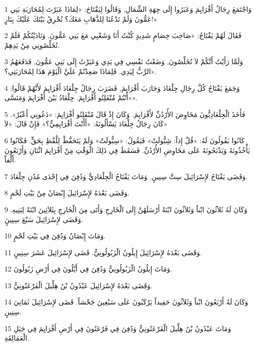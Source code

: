 \par 1 وَاجْتَمَعَ رِجَالُ أَفْرَايِمَ وَعَبَرُوا إِلَى جِهَةِ الشِّمَالِ, وَقَالُوا لِيَفْتَاحَ: «لِمَاذَا عَبَرْتَ لِمُحَارَبَةِ بَنِي عَمُّونَ وَلَمْ تَدْعُنَا لِلذَّهَابِ مَعَكَ؟ نُحْرِقُ بَيْتَكَ عَلَيْكَ بِنَارٍ!»
\par 2 فَقَالَ لَهُمْ يَفْتَاحُ: «صَاحِبَ خِصَامٍ شَدِيدٍ كُنْتُ أَنَا وَشَعْبِي مَعَ بَنِي عَمُّونَ, وَنَادَيْتُكُمْ فَلَمْ تُخَلِّصُونِي مِنْ يَدِهِمْ.
\par 3 وَلَمَّا رَأَيْتُ أَنَّكُمْ لاَ تُخَلِّصُونَ, وَضَعْتُ نَفْسِي فِي يَدِي وَعَبَرْتُ إِلَى بَنِي عَمُّونَ, فَدَفَعَهُمُ الرَّبُّ لِيَدِي. فَلِمَاذَا صَعِدْتُمْ عَلَيَّ الْيَوْمَ هَذَا لِمُحَارَبَتِي؟».
\par 4 وَجَمَعَ يَفْتَاحُ كُلَّ رِجَالِ جِلْعَادَ وَحَارَبَ أَفْرَايِمَ, فَضَرَبَ رِجَالُ جِلْعَادَ أَفْرَايِمَ لأَنَّهُمْ قَالُوا: «أَنْتُمْ مُنْفَلِتُو أَفْرَايِمَ. جِلْعَادُ بَيْنَ أَفْرَايِمَ وَمَنَسَّى».
\par 5 فَأَخَذَ الْجِلْعَادِيُّونَ مَخَاوِضَ الأُرْدُنِّ لأَفْرَايِمَ. وَكَانَ إِذْ قَالَ مُنْفَلِتُو أَفْرَايِمَ: «دَعُونِي أَعْبُرْ». كَانَ رِجَالُ جِلْعَادَ يَسْأَلُونَهُ: «أَأَنْتَ أَفْرَايِمِيٌّ؟» فَإِنْ قَالَ: «لاَ»
\par 6 كَانُوا يَقُولُونَ لَهُ: «قُلْ إِذاً: شِبُّولَتْ» فَيَقُولُ: «سِبُّولَتْ» وَلَمْ يَتَحَفَّظْ لِلَّفْظِ بِحَقٍّ. فَكَانُوا يَأْخُذُونَهُ وَيَذْبَحُونَهُ عَلَى مَخَاوِضِ الأُرْدُنِّ. فَسَقَطَ فِي ذَلِكَ الْوَقْتِ مِنْ أَفْرَايِمَ اثْنَانِ وَأَرْبَعُونَ أَلْفاً.
\par 7 وَقَضَى يَفْتَاحُ لإِسْرَائِيلَ سِتَّ سِنِينٍ. وَمَاتَ يَفْتَاحُ الْجِلْعَادِيُّ وَدُفِنَ فِي إِحْدَى مُدُنِ جِلْعَادَ.
\par 8 وَقَضَى بَعْدَهُ لإِسْرَائِيلَ إِبْصَانُ مِنْ بَيْتِ لَحْمٍ.
\par 9 وَكَانَ لَهُ ثَلاَثُونَ ابْناً وَثَلاَثُونَ ابْنَةً أَرْسَلَهُنَّ إِلَى الْخَارِجِ وَأَتَى مِنَ الْخَارِجِ بِثَلاَثِينَ ابْنَةً لِبَنِيهِ. وَقَضَى لإِسْرَائِيلَ سَبْعَ سِنِينٍَ.
\par 10 وَمَاتَ إِبْصَانُ وَدُفِنَ فِي بَيْتِ لَحْمٍ.
\par 11 وَقَضَى بَعْدَهُ لإِسْرَائِيلَ إِيلُونُ الّزَبُولُونِيُّ. قَضَى لإِسْرَائِيلَ عَشَرَ سِنِينٍ.
\par 12 وَمَاتَ إِيلُونُ الّزَبُولُونِيُّ وَدُفِنَ فِي أَيَّلُونَ فِي أَرْضِ زَبُولُونَ.
\par 13 وَقَضَى بَعْدَهُ لإِسْرَائِيلَ عَبْدُونُ بْنُ هِلِّيلَ الْفَرْعَتُونِيُّ.
\par 14 وَكَانَ لَهُ أَرْبَعُونَ ابْناً وَثَلاَثُونَ حَفِيداً يَرْكَبُونَ عَلَى سَبْعِينَ جَحْشاً. قَضَى لإِسْرَائِيلَ ثَمَانِيَ سِنِينٍ.
\par 15 وَمَاتَ عَبْدُونُ بْنُ هِلِّيلَ الْفَرْعَتُونِيُّ وَدُفِنَ فِي فَرْعَتُونَ فِي أَرْضِ أَفْرَايِمَ فِي جَبَلِ الْعَمَالِقَةِ.

